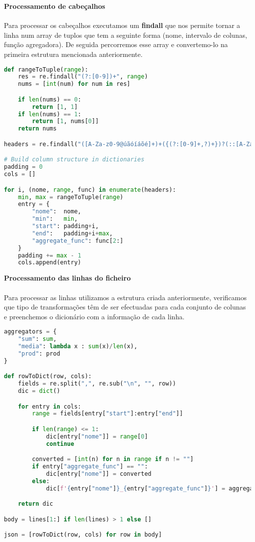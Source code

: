 \documentclass[11pt,a4paper]{report}
\begin{document}
\item\textbf{Processamento de cabeçalhos}
\paragraph{}
Para processar os cabeçalhos executamos um \textbf{findall} que nos permite tornar a linha num array de tuplos que tem a seguinte forma (nome, intervalo de colunas, função agregadora). De seguida percorremos esse array e convertemo-lo na primeira estrutura mencionada anteriormente.

\begin{lstlisting}[language=Python]
def rangeToTuple(range):
    res = re.findall("(?:[0-9])+", range)
    nums = [int(num) for num in res]

    if len(nums) == 0:
        return [1, 1]
    if len(nums) == 1:
        return [1, nums[0]]
    return nums

headers = re.findall("([A-Za-z0-9@úãóíáõé]+)+({(?:[0-9]+,?)+})?(::[A-Za-z]+)?", lines[0])

# Build column structure in dictionaries
padding = 0
cols = []

for i, (nome, range, func) in enumerate(headers):
    min, max = rangeToTuple(range)
    entry = {
        "nome":  nome,
        "min":   min,
        "start": padding+i,
        "end":   padding+i+max,
        "aggregate_func": func[2:]
    }
    padding += max - 1
    cols.append(entry)
\end{lstlisting}

\item \textbf{Processamento das linhas do ficheiro}
\paragraph{}
Para processar as linhas utilizamos a estrutura criada anteriormente, verificamos que tipo de transformações  
têm de ser efectuadas para cada conjunto de colunas e preenchemos o dicionário com a informação de cada linha.  \\
\begin{lstlisting}[language=Python]
aggregators = {
    "sum": sum,
    "media": lambda x : sum(x)/len(x),
    "prod": prod
}

def rowToDict(row, cols):
    fields = re.split(",", re.sub("\n", "", row))
    dic = dict()

    for entry in cols:
        range = fields[entry["start"]:entry["end"]]

        if len(range) <= 1:
            dic[entry["nome"]] = range[0]
            continue

        converted = [int(n) for n in range if n != ""]
        if entry["aggregate_func"] == "":
            dic[entry["nome"]] = converted
        else:
            dic[f'{entry["nome"]}_{entry["aggregate_func"]}'] = aggregators[entry["aggregate_func"]](converted)

    return dic

body = lines[1:] if len(lines) > 1 else []

json = [rowToDict(row, cols) for row in body]
\end{lstlisting}
\end{document}
